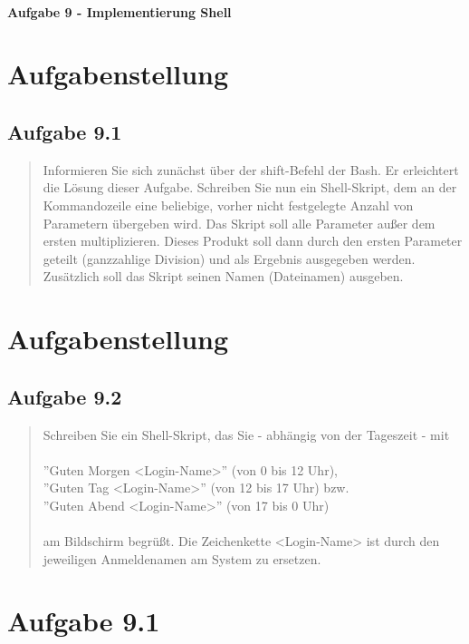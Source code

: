\newpage

\paragraph{\LARGE Aufgabe 9 - Implementierung Shell}

\section{Aufgabenstellung}
	\subsection{Aufgabe 9.1}
		\begin{quote}
			Informieren Sie sich zun\"achst \"uber der shift-Befehl der Bash. Er erleichtert die L\"osung dieser Aufgabe. Schreiben Sie nun ein Shell-Skript, dem an der Kommandozeile eine beliebige, vorher nicht festgelegte Anzahl von Parametern \"ubergeben wird. Das Skript soll alle Parameter au\ss er dem ersten multiplizieren. Dieses Produkt soll dann durch den ersten Parameter geteilt (ganzzahlige Division) und als Ergebnis ausgegeben werden. Zus\"atzlich soll das Skript seinen Namen (Dateinamen) ausgeben.\\
		\end{quote}

\section{Aufgabenstellung}
	\subsection{Aufgabe 9.2}
		\begin{quote}
			Schreiben Sie ein Shell-Skript, das Sie - abh\"angig von der Tageszeit - mit\\ \\
			''Guten Morgen <Login-Name>'' (von 0 bis 12 Uhr),\\
			''Guten Tag <Login-Name>'' (von 12 bis 17 Uhr) bzw.\\
			''Guten Abend <Login-Name>'' (von 17 bis 0 Uhr)\\ \\
			am Bildschirm begr\"u\ss t. Die Zeichenkette <Login-Name> ist durch den jeweiligen Anmeldenamen am System zu ersetzen.\\
		\end{quote}
\newpage
\section{Aufgabe 9.1}
